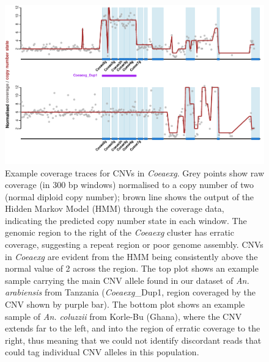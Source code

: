 \documentclass[a4paper,12pt]{article}
\begin{document}
\clearpage


\begin{figure}[h]
	\begin{center}
		\includegraphics*[width = 15cm]{../../CNV_analysis/CNV_example_plots/example_plots_modified.pdf}
		\caption{\footnotesize Example coverage traces for CNVs in \textit{Coeaexg}. Grey points show raw coverage (in 300 bp windows) normalised to a copy number of two (normal diploid copy number); brown line shows the output of the Hidden Markov Model (HMM) through the coverage data, indicating the predicted copy number state in each window. The genomic region to the right of the \textit{Coeaexg} cluster has erratic coverage, suggesting a repeat region or poor genome assembly. CNVs in \textit{Coeaexg} are evident from the HMM being consistently above the normal value of 2 across the region. The top plot shows an example sample carrying the main CNV allele found in our dataset of \textit{An. arabiensis} from Tanzania (\textit{Coeaexg}\_Dup1, region coveraged by the CNV shown by purple bar). The bottom plot shows an example sample of \textit{An. coluzzii} from Korle-Bu (Ghana), where the CNV extends far to the left, and into the region of erratic coverage to the right, thus meaning that we could not identify discordant reads that could tag individual CNV alleles in this population.}
	\end{center}
	\label{FigS7}
\end{figure}
 

\clearpage
\end{document}
